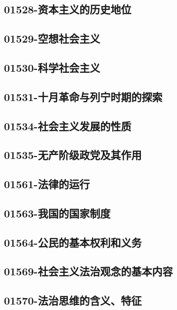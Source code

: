 \subsection{01528-资本主义的历史地位}

\subsection{01529-空想社会主义}

\subsection{01530-科学社会主义}

\subsection{01531-十月革命与列宁时期的探索}

\subsection{01534-社会主义发展的性质}

\subsection{01535-无产阶级政党及其作用}

\subsection{01561-法律的运行}

\subsection{01563-我国的国家制度}

\subsection{01564-公民的基本权利和义务}

\subsection{01569-社会主义法治观念的基本内容}

\subsection{01570-法治思维的含义、特征}

